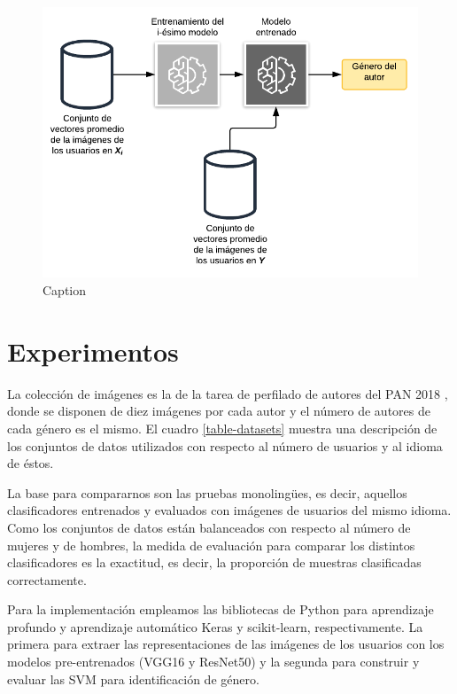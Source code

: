 \documentclass[runningheads]{llncs}
\begin{document}
\begin{figure}[!h]
    \centering
    \includegraphics[scale=0.3]{img/classifier_scheme.png}
    \caption{Caption}
    \label{fig:classifier}
\end{figure}


\section{Experimentos}

La colección de imágenes es la de la tarea de perfilado de autores del PAN 2018
\cite{rangel_rosso_montes-y-gomez_potthast_stein}, donde se disponen de diez imágenes por cada autor y el número de autores de cada género es el mismo. El cuadro \ref{table-datasets}
muestra una descripción de los conjuntos de datos utilizados con respecto al número
de usuarios y al idioma de éstos.

La base para compararnos son las pruebas monolingües, es decir, aquellos
clasificadores entrenados y evaluados con imágenes de usuarios del mismo idioma.
Como los conjuntos de datos están balanceados con respecto al número de mujeres
y de hombres, la medida de evaluación para comparar los distintos clasificadores
es la exactitud, es decir, la proporción de muestras clasificadas correctamente.


Para la implementación empleamos las bibliotecas de Python para aprendizaje 
profundo y aprendizaje automático Keras y scikit-learn, respectivamente. La primera
para extraer las representaciones de las imágenes de los usuarios con los modelos
pre-entrenados (VGG16 y ResNet50) y la segunda para construir y evaluar las SVM
para identificación de género. 
\end{document}

